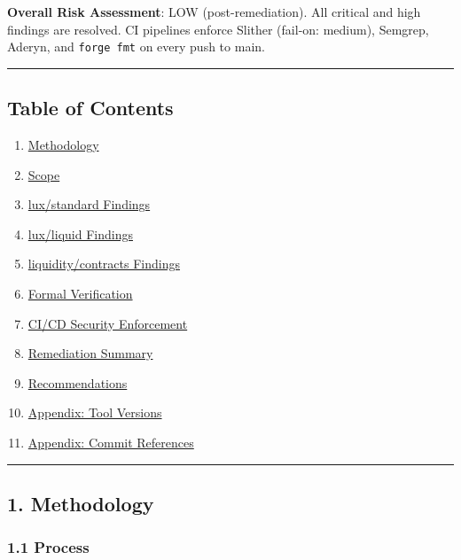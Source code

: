 \documentclass[
]{article}
\providecommand{\tightlist}{%
  \setlength{\itemsep}{0pt}\setlength{\parskip}{0pt}}
\begin{document}
\textbf{Overall Risk Assessment}: LOW (post-remediation). All critical
and high findings are resolved. CI pipelines enforce Slither (fail-on:
medium), Semgrep, Aderyn, and \texttt{forge\ fmt} on every push to main.

\begin{center}\rule{0.5\linewidth}{0.5pt}\end{center}

\subsection{Table of Contents}\label{table-of-contents}

\begin{enumerate}
\def\labelenumi{\arabic{enumi}.}
\tightlist
\item
  \hyperref[1-methodology]{Methodology}
\item
  \hyperref[2-scope]{Scope}
\item
  \hyperref[3-luxstandard-findings-v165]{lux/standard Findings}
\item
  \hyperref[4-luxliquid-findings-v110]{lux/liquid Findings}
\item
  \hyperref[5-liquiditycontracts-findings]{liquidity/contracts Findings}
\item
  \hyperref[6-formal-verification]{Formal Verification}
\item
  \hyperref[7-cicd-security-enforcement]{CI/CD Security Enforcement}
\item
  \hyperref[8-remediation-summary]{Remediation Summary}
\item
  \hyperref[9-recommendations]{Recommendations}
\item
  \hyperref[appendix-a-tool-versions]{Appendix: Tool Versions}
\item
  \hyperref[appendix-b-commit-references]{Appendix: Commit References}
\end{enumerate}

\begin{center}\rule{0.5\linewidth}{0.5pt}\end{center}

\subsection{1. Methodology}\label{1-methodology}

\subsubsection{1.1 Process}\label{11-process}
\end{document}
